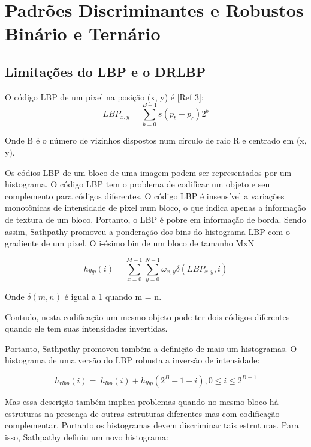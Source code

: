 \documentclass[a4paper,twocolumn]{article}
\begin{document}
\section{Padrões Discriminantes e Robustos Binário e Ternário}

\subsection{Limitações do LBP e o DRLBP}

O código LBP de um pixel na posição (x, y) é [Ref 3]:
\begin{equation}
    \label{eq:target_cost}
    LBP_{x,y} = \displaystyle\sum_{b=0}^{B - 1} s(p_{b} - p_{c})2^b
\end{equation}

Onde B é o número de vizinhos dispostos num círculo de raio R e centrado em (x, y). 

Os códios LBP de um bloco de uma imagem podem ser representados por um histograma. O código LBP tem o problema de codificar um objeto e seu complemento para códigos diferentes. O código LBP é insensível a variações monotônicas de intensidade de pixel num bloco, o que indica apenas a informação de textura de um bloco. Portanto, o LBP é pobre em informação de borda. Sendo assim, Sathpathy promoveu a ponderação dos bins do histograma LBP com o gradiente de um pixel. O i-ésimo bin de um bloco de tamanho MxN

\begin{equation}
    \label{eq:target_cost}
    h_{lbp}(i) = \displaystyle\sum_{x=0}^{M - 1} \sum_{y=0}^{N - 1} \omega_{x,y}\delta(LBP_{x,y}, i)
\end{equation}

Onde $\delta(m, n)$ é igual a 1 quando m = n.

Contudo, nesta codificação um mesmo objeto pode ter dois códigos diferentes quando ele tem suas intensidades invertidas. 

Portanto, Sathpathy promoveu também a definição de mais um histogramas. O histograma de uma versão do LBP robusta a inversão de intensidade:

\begin{equation}
    \label{eq:target_cost}
    h_{rlbp}(i) = \displaystyle\ h_{lbp}(i) + h_{lbp}(2^B - 1 - i), 0\leq i \leq 2^{B - 1}
\end{equation}

Mas essa descrição também implica problemas quando no mesmo bloco há estruturas na presença de outras estruturas diferentes mas com codificação complementar. Portanto os histogramas devem discriminar tais estruturas. Para isso, Sathpathy definiu um novo histograma:
\end{document}
